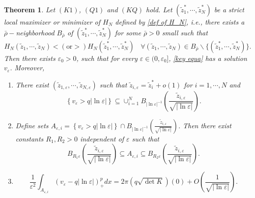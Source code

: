 \documentclass[12pt,reqno]{amsart}
\numberwithin{equation}{section}
\newtheorem{theorem}{Theorem}[section]
\theoremstyle{definition}
\theoremstyle{remark}
\begin{document}
\begin{theorem}\label{thm0}
	Let $(K1)$, $ (Q1) $ and $ (KQ) $ hold.  %
	Let $ \left( \tilde{z}_1^*,\cdots, \tilde{z}_N^*\right)  $ be a strict local maximizer or minimizer of $ H_N $ defined by \eqref{def of H_N}, i.e., there exists a $ \bar{\rho}- $neighborhood $ B_{\bar{\rho}} $ of $ \left( \tilde{z}_1^*,\cdots, \tilde{z}_N^*\right) $ for some $ \bar{\rho}>0 $ small  such that
	\begin{equation*}
	H_N\left( \tilde{z}_1,\cdots, \tilde{z}_N\right)<(\text{or} >) H_N\left( \tilde{z}_1^*,\cdots, \tilde{z}_N^*\right)\ \ \ \ \forall \left( \tilde{z}_1,\cdots, \tilde{z}_N\right)\in B_{\bar{\rho}}\backslash\{\left( \tilde{z}_1^*,\cdots, \tilde{z}_N^*\right) \}.
	\end{equation*} 
	Then  there exists $ \varepsilon_0>0 $, such that for every $ \varepsilon\in(0,\varepsilon_0] $, \eqref{key equa} has a  solution  $ v_\varepsilon $. Moreover,  
	\begin{enumerate}
		\item There exist $ \left (\tilde{z}_{1,\varepsilon}, \cdots, \tilde{z}_{N,\varepsilon}\right ) $ such that $ \tilde{z}_{i,\varepsilon}=\tilde{z}_{i}^*+o(1) $ for $ i=1,\cdots,N $ and 
		\begin{equation*}
		\left \{v_\varepsilon>q|\ln\varepsilon|\right \}\subseteq \cup_{i=1}^N B_{|\ln\varepsilon|^{-1}}\left (\frac{\tilde{z}_{i,\varepsilon}}{\sqrt{|\ln\varepsilon|}}\right ).
		\end{equation*}
		
		\item Define  sets $ A_{\varepsilon,i}=\left\{v_\varepsilon>q|\ln\varepsilon|\right\}\cap B_{|\ln\varepsilon|^{-1}}\left (\frac{\tilde{z}_{i,\varepsilon}}{\sqrt{|\ln\varepsilon|}}\right )  $. Then there exist constants $ R_1,R_2>0 $ independent of $ \varepsilon $  such that
		\begin{equation*}
		B_{R_1\varepsilon}\left (\frac{\tilde{z}_{i,\varepsilon}}{\sqrt{|\ln\varepsilon|}}\right )\subseteq A_{\varepsilon,i}\subseteq B_{R_2\varepsilon}\left (\frac{\tilde{z}_{i,\varepsilon}}{\sqrt{|\ln\varepsilon|}}\right ).
		\end{equation*}
		\item 
		\begin{equation*}
		\frac{1}{\varepsilon^2}\int_{A_{\varepsilon,i}}\left (v_\varepsilon-q|\ln \varepsilon|\right )^{p}_+dx=2\pi \left( q\sqrt{\det K}\right) (0)+O\left (\frac{1}{\sqrt{|\ln\varepsilon|}}\right ).
		\end{equation*}
	\end{enumerate}
\end{theorem}	
\end{document}
